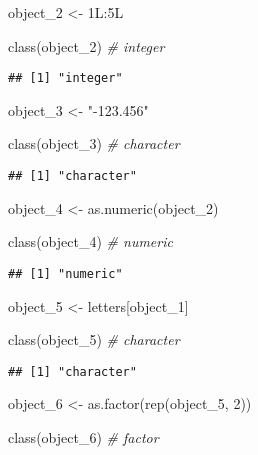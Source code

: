 \documentclass[
]{article}
\newenvironment{Shaded}{\begin{snugshade}}{\end{snugshade}}
\newcommand{\CommentTok}[1]{\textcolor[rgb]{0.56,0.35,0.01}{\textit{#1}}}
\newcommand{\DecValTok}[1]{\textcolor[rgb]{0.00,0.00,0.81}{#1}}
\newcommand{\FunctionTok}[1]{\textcolor[rgb]{0.00,0.00,0.00}{#1}}
\newcommand{\NormalTok}[1]{#1}
\newcommand{\OtherTok}[1]{\textcolor[rgb]{0.56,0.35,0.01}{#1}}
\newcommand{\SpecialCharTok}[1]{\textcolor[rgb]{0.00,0.00,0.00}{#1}}
\newcommand{\StringTok}[1]{\textcolor[rgb]{0.31,0.60,0.02}{#1}}
\begin{document}
\begin{Shaded}
\begin{Highlighting}[]
\NormalTok{object\_2 }\OtherTok{\textless{}{-}}\NormalTok{ 1L}\SpecialCharTok{:}\NormalTok{5L}

\FunctionTok{class}\NormalTok{(object\_2) }\CommentTok{\# integer}
\end{Highlighting}
\end{Shaded}

\begin{verbatim}
## [1] "integer"
\end{verbatim}

\begin{Shaded}
\begin{Highlighting}[]
\NormalTok{object\_3 }\OtherTok{\textless{}{-}} \StringTok{"{-}123.456"}

\FunctionTok{class}\NormalTok{(object\_3) }\CommentTok{\# character}
\end{Highlighting}
\end{Shaded}

\begin{verbatim}
## [1] "character"
\end{verbatim}

\begin{Shaded}
\begin{Highlighting}[]
\NormalTok{object\_4 }\OtherTok{\textless{}{-}} \FunctionTok{as.numeric}\NormalTok{(object\_2)}

\FunctionTok{class}\NormalTok{(object\_4) }\CommentTok{\# numeric}
\end{Highlighting}
\end{Shaded}

\begin{verbatim}
## [1] "numeric"
\end{verbatim}

\begin{Shaded}
\begin{Highlighting}[]
\NormalTok{object\_5 }\OtherTok{\textless{}{-}}\NormalTok{ letters[object\_1]}

\FunctionTok{class}\NormalTok{(object\_5) }\CommentTok{\# character}
\end{Highlighting}
\end{Shaded}

\begin{verbatim}
## [1] "character"
\end{verbatim}

\begin{Shaded}
\begin{Highlighting}[]
\NormalTok{object\_6 }\OtherTok{\textless{}{-}} \FunctionTok{as.factor}\NormalTok{(}\FunctionTok{rep}\NormalTok{(object\_5, }\DecValTok{2}\NormalTok{))}

\FunctionTok{class}\NormalTok{(object\_6) }\CommentTok{\# factor}
\end{Highlighting}
\end{Shaded}
\end{document}
